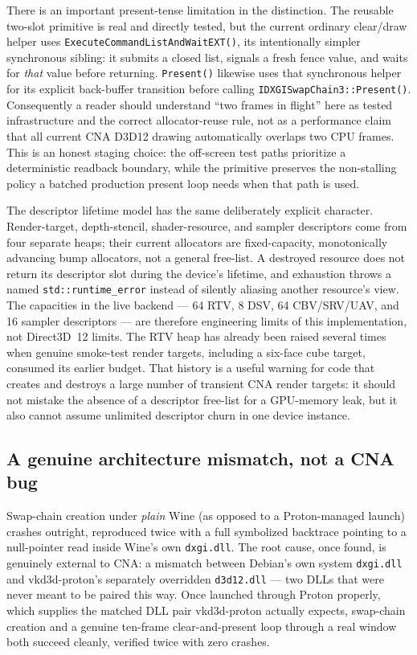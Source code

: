 There is an important present-tense limitation in the distinction.  The reusable
two-slot primitive is real and directly tested, but the current ordinary clear/draw helper
uses \texttt{ExecuteCommandListAndWaitEXT()}, its intentionally simpler synchronous sibling:
it submits a closed list, signals a fresh fence value, and waits for \emph{that} value before
returning.  \texttt{Present()} likewise uses that synchronous helper for its explicit
back-buffer transition before calling \texttt{IDXGISwapChain3::Present()}.  Consequently a
reader should understand ``two frames in flight'' here as tested infrastructure and the
correct allocator-reuse rule, not as a performance claim that all current CNA D3D12 drawing
automatically overlaps two CPU frames.  This is an honest staging choice: the off-screen
test paths prioritize a deterministic readback boundary, while the primitive preserves the
non-stalling policy a batched production present loop needs when that path is used.

The descriptor lifetime model has the same deliberately explicit character.  Render-target,
depth-stencil, shader-resource, and sampler descriptors come from four separate heaps; their
current allocators are fixed-capacity, monotonically advancing bump allocators, not a general
free-list.  A destroyed resource does not return its descriptor slot during the device's
lifetime, and exhaustion throws a named \texttt{std::runtime\_error} instead of silently
aliasing another resource's view.  The capacities in the live backend --- 64 RTV, 8 DSV,
64 CBV/SRV/UAV, and 16 sampler descriptors --- are therefore engineering limits of this
implementation, not Direct3D~12 limits.  The RTV heap has already been raised several times
when genuine smoke-test render targets, including a six-face cube target, consumed its earlier
budget.  That history is a useful warning for code that creates and destroys a large number
of transient CNA render targets: it should not mistake the absence of a descriptor free-list
for a GPU-memory leak, but it also cannot assume unlimited descriptor churn in one device
instance.

\subsection{A genuine architecture mismatch, not a CNA bug}

Swap-chain creation under \emph{plain} Wine (as opposed to a Proton-managed launch) crashes
outright, reproduced twice with a full symbolized backtrace pointing to a null-pointer read
inside Wine's own \texttt{dxgi.dll}. The root cause, once found, is genuinely external to
CNA: a mismatch between Debian's own system \texttt{dxgi.dll} and vkd3d-proton's separately
overridden \texttt{d3d12.dll} --- two DLLs that were never meant to be paired this way. Once
launched through Proton properly, which supplies the matched DLL pair vkd3d-proton actually
expects, swap-chain creation and a genuine ten-frame clear-and-present loop through a real
window both succeed cleanly, verified twice with zero crashes.

